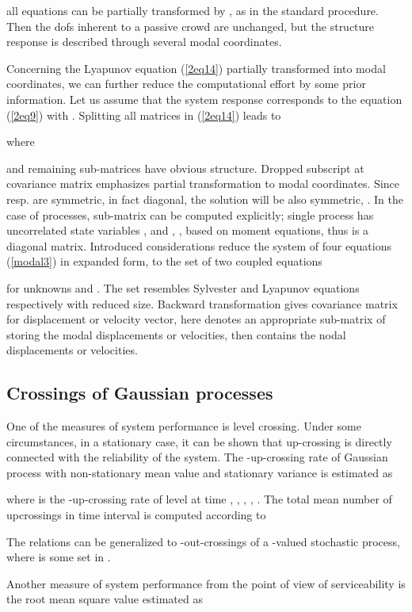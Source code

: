 \documentclass[preprint,12pt,authoryear]{elsarticle}
\begin{document}
all equations can be partially transformed by , as in the standard procedure. Then the dofs inherent to a passive crowd are unchanged, but the structure response is described through several modal coordinates.

Concerning the Lyapunov equation (\ref{2eq14}) partially transformed into modal coordinates, we can further reduce the computational effort by some prior information. Let us assume that the system response corresponds to the equation (\ref{2eq9}) with . Splitting all matrices in (\ref{2eq14}) leads to

where

 and remaining sub-matrices have obvious structure. Dropped subscript at covariance matrix  emphasizes partial transformation to modal coordinates. Since  resp.  are symmetric, in fact diagonal, the solution will be also symmetric, . In the case of  processes, sub-matrix  can be computed explicitly; single  process has uncorrelated state variables ,  and , , based on moment equations, thus  is a diagonal matrix. Introduced considerations reduce the system of four equations (\ref{modal3}) in expanded form, to the set of two coupled equations

for unknowns  and . The set resembles Sylvester and Lyapunov equations respectively with reduced size. Backward transformation  gives covariance matrix for displacement or velocity vector, here  denotes an appropriate sub-matrix of  storing the modal displacements or velocities,  then contains the nodal displacements or velocities.
\subsection{Crossings of Gaussian processes}
\label{upcrossing}
One of the measures of system performance is level crossing. Under some circumstances, in a stationary case, it can be shown that up-crossing is directly connected with the reliability of the system. The -up-crossing rate of Gaussian process  with non-stationary mean value  and stationary variance  is estimated as \citep{Soong}

where  is the -up-crossing rate of level  at time , , , , . The total mean number of upcrossings in time interval  is computed according to

The relations can be generalized to -out-crossings of a -valued stochastic process, where  is some set in .

Another measure of system performance from the point of view of serviceability is the root mean square value estimated as
\end{document}
